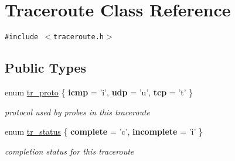 \hypertarget{classTraceroute}{
\section{Traceroute Class Reference}
\label{classTraceroute}
}
{\tt \#include $<$traceroute.h$>$}

\subsection*{Public Types}
\begin{CompactItemize}
\item 
enum \hyperlink{classTraceroute_9b1fb106e701234f6aa6e752413fe300}{tr\_\-proto} \{ \textbf{icmp} = 'i', 
\textbf{udp} = 'u', 
\textbf{tcp} = 't'
 \}
\begin{CompactList}\small\item\em protocol used by probes in this traceroute \item\end{CompactList}\item 
enum \hyperlink{classTraceroute_dfccd360ace7950ed27e03705742fdc2}{tr\_\-status} \{ \textbf{complete} = 'c', 
\textbf{incomplete} = 'i'
 \}
\begin{CompactList}\small\item\em completion status for this traceroute \item\end{CompactList}\end{CompactItemize}
